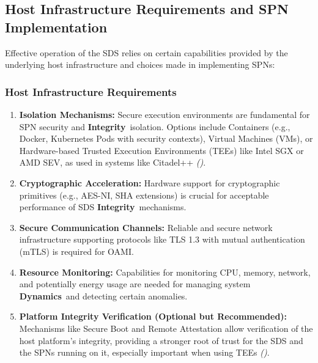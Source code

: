 \documentclass[12pt,a4paper]{report}
\renewcommand{\citep}[1]{\textit{\scriptsize{(\cite{#1})}}}
\newcommand{\Integrity}{\textbf{Integrity}}
\newcommand{\Dynamics}{\textbf{Dynamics}}
\begin{document}
	\subsection{Host Infrastructure Requirements and SPN Implementation} %
	\label{sec:4-2-3} %
	
	Effective operation of the SDS relies on certain capabilities provided by the underlying host infrastructure and choices made in implementing SPNs:
	
	\subsubsection{Host Infrastructure Requirements} %
	\label{sec:4-2-3-1} %
	\begin{enumerate}[noitemsep]
		\item \textbf{Isolation Mechanisms:} Secure execution environments are fundamental for SPN security and \Integrity\ isolation. Options include Containers (e.g., Docker, Kubernetes Pods with security contexts), Virtual Machines (VMs), or Hardware-based Trusted Execution Environments (TEEs) like Intel SGX or AMD SEV, as used in systems like Citadel++ \citep{Citadel_PlusPlus_2025}.
		\item \textbf{Cryptographic Acceleration:} Hardware support for cryptographic primitives (e.g., AES-NI, SHA extensions) is crucial for acceptable performance of SDS \Integrity\ mechanisms.
		\item \textbf{Secure Communication Channels:} Reliable and secure network infrastructure supporting protocols like TLS 1.3 with mutual authentication (mTLS) is required for OAMI.
		\item \textbf{Resource Monitoring:} Capabilities for monitoring CPU, memory, network, and potentially energy usage are needed for managing system \Dynamics\ and detecting certain anomalies.
		\item \textbf{Platform Integrity Verification (Optional but Recommended):} Mechanisms like Secure Boot and Remote Attestation allow verification of the host platform's integrity, providing a stronger root of trust for the SDS and the SPNs running on it, especially important when using TEEs \citep{Citadel_PlusPlus_2025}.
	\end{enumerate}
	
\end{document}
